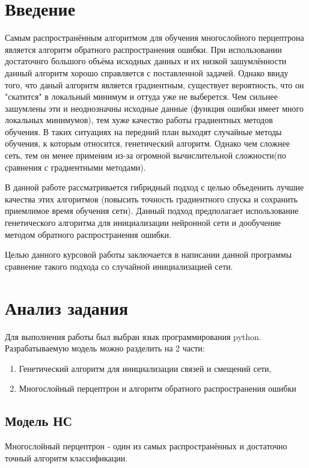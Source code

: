\documentclass[a4paper,12pt]{article}
\begin{document}
\newpage\section*{Введение}
Самым распространённым алгоритмом для обучения многослойного перцептрона является алгоритм обратного распространения ошибки. При использовании достаточнго большого объёма исходных данных и их низкой зашумлённости данный алгоритм хорошо справляется с поставленной задачей. Однако ввиду того, что даный алгоритм является градиентным, существует вероятность, что он "скатится" в локальный минимум и оттуда уже не выберется. Чем сильнее зашумлены эти и неоднозначны исходные данные (функция ошибки имеет много локальных минимумов), тем хуже качество работы градиентных методов обучения. В таких ситуациях на передний план выходят случайные методы обучения, к которым относится, генетический алгоритм. Однако чем сложнее сеть, тем он менее применим из-за огромной вычислительной сложности(по сравнения с градиентными методами). 
\par В данной работе рассматривается гибридный подход с целью объеденить лучшие качества этих алгоритмов (повысить точность градиентного спуска и сохранить приемлимое время обучения сети). Данный подход предполагает использование генетического алгоритма для инициализации нейронной сети и дообучение методом обратного распространения ошибки.
\par 

\par Целью данного курсовой работы заключается в написании данной программы сравнение такого подхода со случайной инициализацией сети.


\newpage\section{Анализ задания}
Для выполнения работы был выбран язык программирования python. Разрабатываемую модель можно разделить на 2 части: 
\begin{enumerate}
\item Генетический алгоритм для инициализации связей и смещений сети,
\item Многослойный перцептрон и алгоритм обратного распространения ошибки
\end{enumerate}

\subsection{Модель НС}
Многослойный перцептрон - один из самых распространённых и достаточно точный алгоритм классификации.
\end{document}

